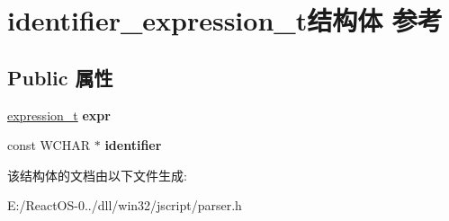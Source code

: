 \hypertarget{structidentifier__expression__t}{}\section{identifier\+\_\+expression\+\_\+t结构体 参考}
\label{structidentifier__expression__t}
\subsection*{Public 属性}
\begin{DoxyCompactItemize}
\item 
\mbox{\label{structidentifier__expression__t_a462a813b5fafb3f619a237fa3277c3a6}} 
\hyperlink{struct__expression__t}{expression\+\_\+t} {\bfseries expr}
\item 
\mbox{\label{structidentifier__expression__t_ab9abb15686c9cb0ea04c075e67bcfc9b}} 
const W\+C\+H\+AR $\ast$ {\bfseries identifier}
\end{DoxyCompactItemize}


该结构体的文档由以下文件生成\+:\begin{DoxyCompactItemize}
\item 
E\+:/\+React\+O\+S-\/0../dll/win32/jscript/parser.\+h\end{DoxyCompactItemize}
